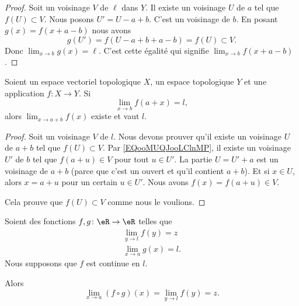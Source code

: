 \begin{proof}
	Soit un voisinage \( V\) de \( \ell\) dans \( Y\). Il existe un voisinage \( U\) de \( a\) tel que \( f(U)\subset V\). Nous posons \( U'=U-a+b\). C'est un voisinage de \( b\). En posant \( g(x)=f(x+a-b)\) nous avons
	\begin{equation}
		g(U')=f(U-a+b+a-b)=f(U)\subset V.
	\end{equation}
	Donc \( \lim_{x\to b}g(x)=\ell\). C'est cette égalité qui signifie \( \lim_{x\to b}f(x+a-b)\).
\end{proof}

\begin{proposition}	\label{PROPooXWNDooGHDXTa}
	Soient un espace vectoriel topologique \( X\), un espace topologique \( Y\) et une application \(f \colon X\to Y  \). Si
	\begin{equation}		\label{EQooMUQJooLClnMP}
		\lim_{x\to b}f(a+x)=l,
	\end{equation}
	alors \( \lim_{x\to a+b}f(x)\) existe et vaut \( l\).
\end{proposition}

\begin{proof}
	Soit un voisinage \( V\) de \( l\). Nous devons prouver qu'il existe un voisinage \( U\) de \( a+b\) tel que \( f(U)\subset V\). Par \eqref{EQooMUQJooLClnMP}, il existe un voisinage \( U'\) de \( b\) tel que \( f(a+u)\in V\) pour tout \( u\in U'\). La partie \( U=U'+a\) est un voisinage de \( a+b\) (parce que c'est un ouvert et qu'il contient \( a+b\)). Et si \( x\in U\), alors \( x=a+u\) pour un certain \( u\in U'\). Nous avons \( f(x)=f(a+u)\in V\).

	Cela prouve que \( f(U)\subset V\) comme nous le voulions.
\end{proof}


\begin{proposition}       \label{PROPooKNVHooXlQyVA}
	Soient des fonctions \( f,g\colon \eR\to \eR\) telles que
	\begin{subequations}
		\begin{align}
			\lim_{y\to l} f(y)=z \\
			\lim_{x\to a} g(x)=l.
		\end{align}
	\end{subequations}
	Nous supposons que \( f\) est continue en \( l\).

	Alors
	\begin{equation}
		\lim_{x\to a} (f\circ g)(x)=\lim_{y\to l} f(y)=z.
	\end{equation}
\end{proposition}

